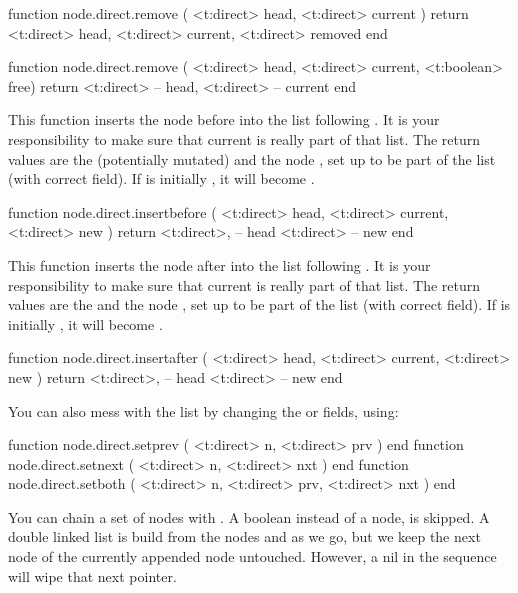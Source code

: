 \starttyping[option=LUA]
function node.direct.remove ( <t:direct> head, <t:direct> current )
    return
        <t:direct> head,
        <t:direct> current,
        <t:direct> removed
end

function node.direct.remove ( <t:direct> head, <t:direct> current, <t:boolean> free)
    return
        <t:direct> -- head,
        <t:direct> -- current
end
\stoptyping

This function inserts the node  before  into the list
following . It is your responsibility to make sure that \type
{current} is really part of that list. The return values are the (potentially
mutated)  and the node , set up to be part of the list
(with correct  field). If  is initially , it
will become .

\starttyping[option=LUA]
function node.direct.insertbefore (
    <t:direct> head,
    <t:direct> current,
    <t:direct> new
)
    return
        <t:direct>, -- head
        <t:direct>  -- new
end
\stoptyping

This function inserts the node  after  into the list
following . It is your responsibility to make sure that \type
{current} is really part of that list. The return values are the  and
the node , set up to be part of the list (with correct 
field). If  is initially , it will become .

\starttyping[option=LUA]
function node.direct.insertafter (
    <t:direct> head,
    <t:direct> current,
    <t:direct> new
)
    return
        <t:direct>, -- head
        <t:direct>  -- new
end
\stoptyping

You can also mess with the list by changing the  or  fields, using:

\starttyping[option=LUA]
function node.direct.setprev ( <t:direct> n, <t:direct> prv                 ) end
function node.direct.setnext ( <t:direct> n, <t:direct> nxt                 ) end
function node.direct.setboth ( <t:direct> n, <t:direct> prv, <t:direct> nxt ) end
\stoptyping

You can chain a set of nodes with . A boolean instead of a node,
is skipped. A double linked list is build from the nodes and as we go, but we
keep the next node of the currently appended node untouched. However, a nil in
the sequence will wipe that next pointer.

